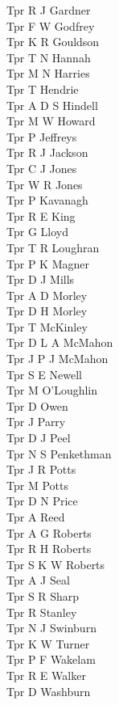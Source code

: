 \begin{multicols}{3}
  Tpr R J Gardner \\
  Tpr F W Godfrey \\
  Tpr K R Gouldson \\
  Tpr T N Hannah \\
  Tpr M N Harries \\
  Tpr T Hendrie \\
  Tpr A D S Hindell \\
  Tpr M W Howard \\
  Tpr P Jeffreys \\
  Tpr R J Jackson \\
  Tpr C J Jones \\
  Tpr W R Jones \\
  Tpr P Kavanagh \\
  Tpr R E King \\
  Tpr G Lloyd \\
  Tpr T R Loughran \\
  Tpr P K Magner \\
  Tpr D J Mills \\
  Tpr A D Morley \\
  Tpr D H Morley \\
  Tpr T McKinley \\
  Tpr D L A McMahon \\
  Tpr J P J McMahon \\
  Tpr S E Newell \\
  Tpr M O'Loughlin \\
  Tpr D Owen \\
  Tpr J Parry \\
  Tpr D J Peel \\
  Tpr N S Penkethman \\
  Tpr J R Potts \\
  Tpr M Potts \\
  Tpr D N Price \\
  Tpr A Reed \\
  Tpr A G Roberts \\
  Tpr R H Roberts \\
  Tpr S K W Roberts \\
  Tpr A J Seal \\
  Tpr S R Sharp \\
  Tpr R Stanley \\
  Tpr N J Swinburn \\
  Tpr K W Turner \\
  Tpr P F Wakelam \\
  Tpr R E Walker \\
  Tpr D Washburn \\

\end{multicols}
